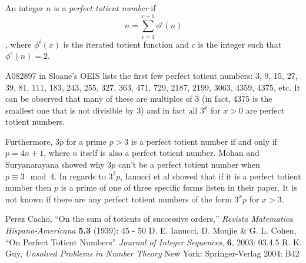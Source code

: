 \documentclass[12pt]{article}
\begin{document}
An integer $n$ is a {\em perfect totient number} if $$n = \sum_{i = 1}^{c + 1} \phi^i(n)$$, where $\phi^i(x)$ is the iterated totient function and $c$ is the integer such that $\phi^c(n) = 2$.

A082897 in Sloane's OEIS lists the first few perfect totient numbers: 3, 9, 15, 27, 39, 81, 111, 183, 243, 255, 327, 363, 471, 729, 2187, 2199, 3063, 4359, 4375, etc. It can be observed that many of these are multiples of 3 (in fact, 4375 is the smallest one that is not divisible by 3) and in fact all $3^x$ for $x > 0$ are perfect totient numbers.

Furthermore, $3p$ for a prime $p > 3$ is a perfect totient number if and only if $p = 4n + 1$, where $n$ itself is also a perfect totient number. Mohan and Suryanarayana showed why $3p$ can't be a perfect totient number when $p \equiv 3 \mod 4$. In regards to $3^2p$, Ianucci et al showed that if it is a perfect totient number then $p$ is a prime of one of three specific forms listen in their paper. It is not known if there are any perfect totient numbers of the form $3^xp$ for $x > 3$.

\begin{thebibliography}{2}
 Perez Cacho, ``On the sum of totients of successive orders,'' {\it Revista Matematica Hispano-Americana} {\bf 5.3} (1939): 45 - 50
 D. E. Ianucci, D. Moujie \& G. L. Cohen, ``On Perfect Totient Numbers'' {\it Journal of Integer Sequences}, {\bf 6}, 2003: 03.4.5
 R. K. Guy, {\it Unsolved Problems in Number Theory} New York: Springer-Verlag 2004: B42
\end{thebibliography}
\end{document}
